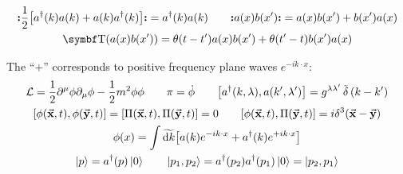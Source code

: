 \begin{gather*}
        \nord{\frac{1}{2}\qty[a^\dagger(k)a(k) + a(k)a^\dagger(k)]} = a^\dagger(k)a(k)
        \qquad
        \nord{a(x)b(x')} = a(x)b(x') + b(x')a(x)
        \\
        \Tordp(a(x)b(x')) = \theta(t-t')a(x)b(x') + \theta(t'-t)b(x')a(x)
\end{gather*}

The ``$+$'' corresponds to positive frequency plane waves $e^{-ik\cdot x}$:
\begin{gather*}
        \Lc = \frac{1}{2}\partial^\mu\phi\partial_\mu\phi - \frac{1}{2}m^2\phi\phi
        \qquad
        \pi = \dot{\phi}
        \qquad
        \comm{a^\dagger\qty(k,\lambda)}{a\qty(k',\lambda')}
        = g^{\lambda\lambda'}\Tdelta\qty(k-k')
        \\
        \comm{\phi(\va{x},t)}{\phi(\va{y},t)} = \comm{\Pi(\va{x},t)}{\Pi(\va{y},t)} = 0
        \qquad
        \comm{\phi(\va{x},t)}{\Pi(\va{y},t)} = i\delta^3\qty(\va{x}-\va{y})
        \\
        \phi(x) = \int\Tdd{k}\qty[a(k)e^{-ik\cdot x} + a^\dagger(k)e^{+ik\cdot x}]
        \\
        \ket{p} = a^\dagger(p)\ket{0}
        \qquad
        \ket{p_1,p_2} = a^\dagger(p_2)a^\dagger(p_1)\ket{0} = \ket{p_2,p_1}
\end{gather*}
